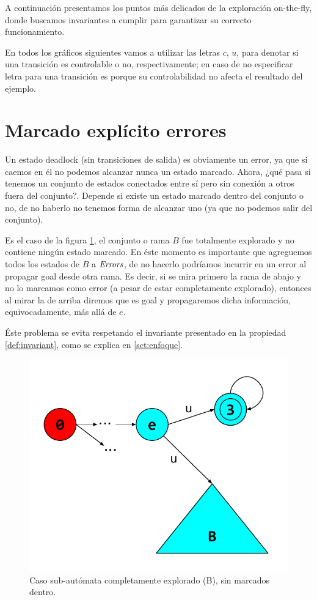 A continuación presentamos los puntos más delicados de la exploración on-the-fly, donde buscamos invariantes a cumplir para garantizar su correcto funcionamiento.

En todos los gráficos siguientes vamos a utilizar las letras $c$, $u$, para denotar si una transición es controlable o no, respectivamente; en caso de no especificar letra para una transición es porque su controlabilidad no afecta el resultado del ejemplo.

\section{Marcado explícito errores}\label{marcarErrores}

Un estado deadlock (sin transiciones de salida) es obviamente un error, ya que si caemos en él no podemos alcanzar nunca un estado marcado. Ahora, ¿qué pasa si tenemos un conjunto de estados conectados entre sí pero sin conexión a otros fuera del conjunto?. Depende si existe un estado marcado dentro del conjunto o no, de no haberlo no tenemos forma de alcanzar uno (ya que no podemos salir del conjunto). 

Es el caso de la figura \ref{fig:falenciasErrores}, el conjunto o rama $B$ fue totalmente explorado y no contiene ningún estado marcado. En éste momento es importante que agreguemos todos los estados de $B$ a $\mathit{Errors}$, de no hacerlo podríamos incurrir en un error al propagar goal desde otra rama. Es decir, si se mira primero la rama de abajo y no lo marcamos como error (a pesar de estar completamente explorado), entonces al mirar la de arriba diremos que es goal y propagaremos dicha información, equivocadamente, más allá de $e$. 

Éste problema se evita respetando el invariante presentado en la propiedad \ref{def:invariant}, como se explica en \ref{sct:enfoque}.

\begin{figure}[htb]
	\centering
	\includegraphics[width=\linewidth/2]{figures/FalenciasErrores.pdf}
	\caption{Caso sub-autómata completamente explorado (B), sin marcados dentro.}
	\label{fig:falenciasErrores}
\end{figure}

